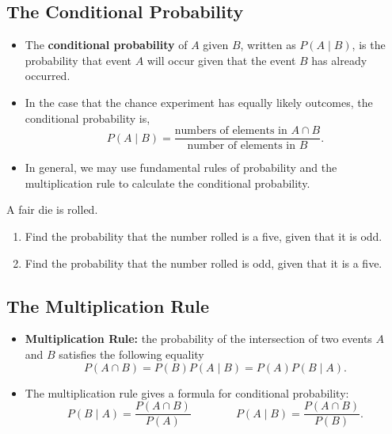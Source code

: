 \hypertarget{the-conditional-probability}{%
\subsection{The Conditional
Probability}\label{the-conditional-probability}}

\begin{itemize}
\item
  The \textbf{conditional probability} of \(A\) given \(B\), written as
  \(P(A\mid B)\), is the probability that event \(A\) will occur given
  that the event \(B\) has already occurred.
\item
  In the case that the chance experiment has equally likely outcomes,
  the conditional probability is, \[
  P(A\mid B)=\dfrac{\text{numbers of elements in }A\cap B}{\text{number of elements in }B}.
  \]
\item
  In general, we may use fundamental rules of probability and the
  multiplication rule to calculate the conditional probability.
\end{itemize}

\begin{example}

A fair die is rolled.

\begin{enumerate}
  \item 
  Find the probability that the number rolled is a five, given that it is odd.
  \item
  Find the probability that the number rolled is odd, given that it is a five.
\end{enumerate}

\end{example}

\hypertarget{the-multiplication-rule}{%
\subsection{The Multiplication Rule}\label{the-multiplication-rule}}

\begin{itemize}
\item
  \textbf{Multiplication Rule:} the probability of the intersection of
  two events \(A\) and \(B\) satisfies the following equality \[
  P(A\cap B)=P(B)P(A\mid B)=P(A)P(B\mid A).
  \]
\item
  The multiplication rule gives a formula for conditional probability:
  \[
  P(B\mid A)=\dfrac{P(A\cap B)}{P(A)}\qquad\qquad P(A\mid B)=\dfrac{P(A\cap B)}{P(B)}.
  \]
\end{itemize}




